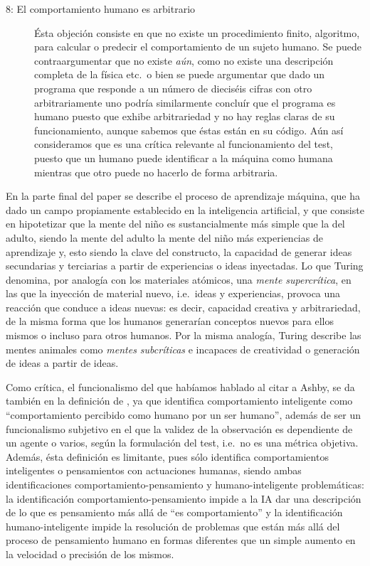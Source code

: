 \documentclass[12pt]{memoir}
\begin{document}
\begin{description}
	\item[8: El comportamiento humano es arbitrario] Ésta objeción consiste en que no existe un procedimiento finito, algoritmo, para calcular o predecir el comportamiento de un sujeto humano. Se puede contraargumentar que no existe \textit{aún}, como no existe una descripción completa de la física etc.\ o bien se puede argumentar que dado un programa que responde a un número de dieciséis cifras con otro arbitrariamente uno podría similarmente concluír que el programa es humano puesto que exhibe arbitrariedad y no hay reglas claras de su funcionamiento, aunque sabemos que éstas están en su código. Aún así consideramos que es una crítica relevante al funcionamiento del test, puesto que un humano puede identificar a la máquina como humana mientras que otro puede no hacerlo de forma arbitraria.
\end{description}

En la parte final del paper se describe el proceso de aprendizaje máquina, que ha dado un campo propiamente establecido en la inteligencia artificial, y que consiste en hipotetizar que la mente del niño es sustancialmente más simple que la del adulto, siendo la mente del adulto la mente del niño más experiencias de aprendizaje y, esto siendo la clave del constructo, la capacidad de generar ideas secundarias y terciarias a partir de experiencias o ideas inyectadas. Lo que Turing denomina, por analogía con los materiales atómicos, una \textit{mente supercrítica}, en las que la inyección de material nuevo, i.e.\ ideas y experiencias, provoca una reacción que conduce a ideas nuevas: es decir, capacidad creativa y arbitrariedad, de la misma forma que los humanos generarían conceptos nuevos para ellos mismos o incluso para otros humanos. Por la misma analogía, Turing describe las mentes animales como \textit{mentes subcríticas} e incapaces de creatividad o generación de ideas a partir de ideas.

Como crítica, el funcionalismo del que habíamos hablado al citar a Ashby, se da también en la definición de \cite{Turing1950cmi}, ya que identifica comportamiento inteligente como ``comportamiento percibido como humano por un ser humano'', además de ser un funcionalismo subjetivo en el que la validez de la observación es dependiente de un agente o varios, según la formulación del test, i.e.\ no es una métrica objetiva. Además, ésta definición es limitante, pues sólo identifica comportamientos inteligentes o pensamientos con actuaciones humanas, siendo ambas identificaciones comportamiento-pensamiento y humano-inteligente problemáticas: la identificación comportamiento-pensamiento impide a la IA dar una descripción de lo que es pensamiento más allá de ``es comportamiento'' y la identificación humano-inteligente impide la resolución de problemas que están más allá del proceso de pensamiento humano en formas diferentes que un simple aumento en la velocidad o precisión de los mismos. 
\end{document}
